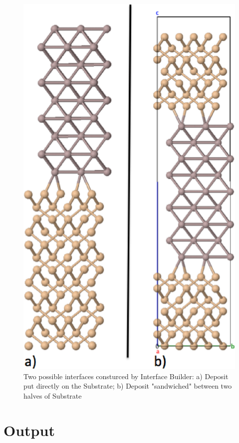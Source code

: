 \documentclass[a4paper,12pt,oneside]{article}
\begin{document}
\begin{figure}
\begin{center}
\includegraphics[scale=0.5]{structures}
\caption{Two possible interfaces consturced by Interface Builder: a) Deposit put
directly on the Substrate; b) Deposit "sandwiched" between two halves of
Substrate}
\label{Fig:struc}
\end{center}
\end{figure}


\section{Output}
\end{document}
